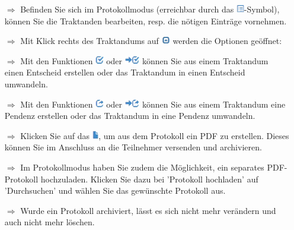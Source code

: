 \documentclass{article}
\begin{document}
\begin{multicols}{2}

\begin{tcolorbox}[colback=blue!5,colframe=blue!40!black,title=Das Protokoll führen]
\begin{itemize}
  \item[$\Longrightarrow$] Befinden Sie sich im Protokollmodus (erreichbar durch das \includegraphics[height=10pt]{Icons/Listensymbol.png}-Symbol), können Sie die Traktanden bearbeiten, resp. die nötigen Einträge vornehmen.
	\item[$\Longrightarrow$] Mit Klick rechts des Traktandums auf \includegraphics[height=10pt]{Icons/eingeklappt.png} werden die Optionen geöffnet:
  \item[$\Longrightarrow$] Mit den Funktionen \includegraphics[height=10pt]{Icons/Gutzeichen_Rahmen.png} oder \includegraphics[height=10pt]{Icons/Pfeil_Gutzeichen.png} können Sie aus einem Traktandum einen Entscheid erstellen oder das Traktandum in einen Entscheid umwandeln.
	  \item[$\Longrightarrow$] Mit den Funktionen \includegraphics[height=10pt]{Icons/Pfeil_aus_Box.png} oder \includegraphics[height=10pt]{Icons/Pfeil_Pfeil_aus_Box.png} können Sie aus einem Traktandum eine Pendenz erstellen oder das Traktandum in eine Pendenz umwandeln.
  \item[$\Longrightarrow$] Klicken Sie auf das \includegraphics[height=10pt]{Icons/Blattsymbol.png}, um aus dem Protokoll ein PDF zu erstellen. Dieses können Sie im Anschluss an die Teilnehmer versenden und archivieren.
	\item[$\Longrightarrow$] Im Protokollmodus haben Sie zudem die Möglichkeit, ein separates PDF-Protokoll hochzuladen. Klicken Sie dazu bei 'Protokoll hochladen' auf 'Durchsuchen' und wählen Sie das gewünschte Protokoll aus.
	\item[$\Longrightarrow$] Wurde ein Protokoll archiviert, lässt es sich nicht mehr verändern und auch nicht mehr löschen.
\end{itemize}
\end{tcolorbox}



\end{multicols}
\end{document}
